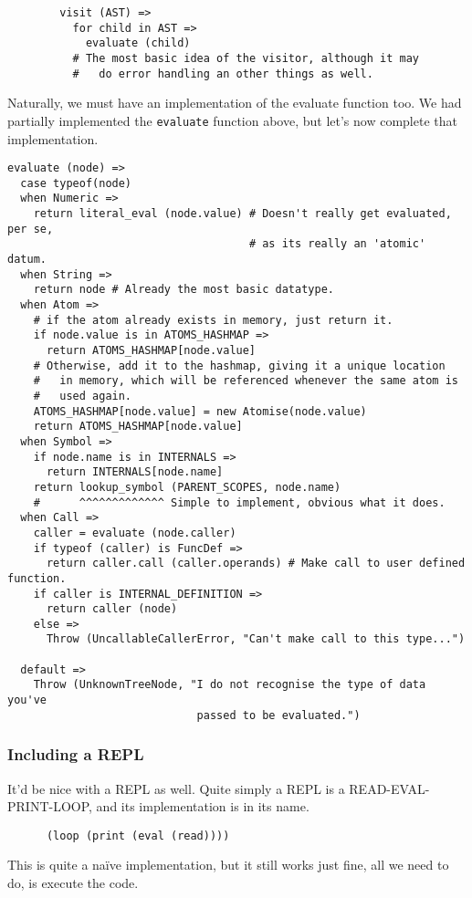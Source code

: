 \documentclass{article}
\newcommand{\code}[1]{\texttt{#1}}
\begin{document}
      \begin{verbatim}
        visit (AST) =>
          for child in AST =>
            evaluate (child)
          # The most basic idea of the visitor, although it may
          #   do error handling an other things as well.
      \end{verbatim}

      Naturally, we must have an implementation of the evaluate function too.
      We had partially implemented the \code{evaluate} function above, but let's
      now complete that implementation.

      \clearpage

      \begin{verbatim}
evaluate (node) =>
  case typeof(node)
  when Numeric =>
    return literal_eval (node.value) # Doesn't really get evaluated, per se,
                                     # as its really an 'atomic' datum.
  when String =>
    return node # Already the most basic datatype.
  when Atom =>
    # if the atom already exists in memory, just return it.
    if node.value is in ATOMS_HASHMAP =>
      return ATOMS_HASHMAP[node.value]
    # Otherwise, add it to the hashmap, giving it a unique location
    #   in memory, which will be referenced whenever the same atom is
    #   used again.
    ATOMS_HASHMAP[node.value] = new Atomise(node.value)
    return ATOMS_HASHMAP[node.value]
  when Symbol =>
    if node.name is in INTERNALS =>
      return INTERNALS[node.name]
    return lookup_symbol (PARENT_SCOPES, node.name)
    #      ^^^^^^^^^^^^^ Simple to implement, obvious what it does.
  when Call =>
    caller = evaluate (node.caller)
    if typeof (caller) is FuncDef =>
      return caller.call (caller.operands) # Make call to user defined function.
    if caller is INTERNAL_DEFINITION =>
      return caller (node)
    else =>
      Throw (UncallableCallerError, "Can't make call to this type...")

  default =>
    Throw (UnknownTreeNode, "I do not recognise the type of data you've
                             passed to be evaluated.")
      \end{verbatim}

  \subsubsection{Including a REPL}
    It'd be nice with a REPL as well. Quite simply a REPL is a
    READ-EVAL-PRINT-LOOP, and its implementation is in its name.
    \begin{verbatim}
      (loop (print (eval (read))))
    \end{verbatim}
    This is quite a na\"{i}ve implementation, but it still works just fine,
    all we need to do, is execute the code.
\end{document}
